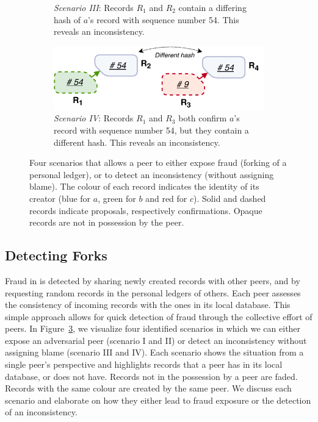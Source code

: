 \begin{figure}[t!]
\begin{subfigure}[t]{.5\textwidth}
		\caption{\emph{Scenario III}: Records $ R_1 $ and $ R_2 $ contain a differing hash of $ a $'s record with sequence number 54. This reveals an inconsistency.}
		\label{fig:fraud_scenario_3}\vspace{0.9cm}
	\end{subfigure}
	\begin{subfigure}[t]{.6\textwidth}
		\centering
		\captionsetup{width=.89\linewidth}
		\includegraphics[width=.98\linewidth]{trustchain/assets/fraud_scenario_4}
		\caption{\emph{Scenario IV}: Records $ R_1 $ and $ R_3 $ both confirm $ a $'s record with sequence number 54, but they contain a different hash. This reveals an inconsistency.}
		\label{fig:fraud_scenario_4}
	\end{subfigure}
	\caption{Four scenarios that allows a peer to either expose fraud (forking of a personal ledger), or to detect an inconsistency (without assigning blame). The colour of each record indicates the identity of its creator (blue for $ a $, green for $ b $ and red for $ c $). Solid and dashed records indicate proposals, respectively confirmations. Opaque records are not in possession by the peer.}
	\label{fig:fraud_scenarios}
\end{figure}

\subsection{Detecting Forks}
\label{sec:detecting_forks}
Fraud in \TrustChain{} is detected by sharing newly created records with other peers, and by requesting random records in the personal ledgers of others.
Each peer assesses the consistency of incoming records with the ones in its local database.
This simple approach allows for quick detection of fraud through the collective effort of peers.
In Figure~\ref{fig:fraud_scenarios}, we visualize four identified scenarios in which we can either expose an adversarial peer (scenario I and II) or detect an inconsistency without assigning blame (scenario III and IV).
Each scenario shows the situation from a single peer's perspective and highlights records that a peer has in its local database, or does not have.
Records not in the possession by a peer are faded.
Records with the same colour are created by the same peer.
We discuss each scenario and elaborate on how they either lead to fraud exposure or the detection of an inconsistency.


